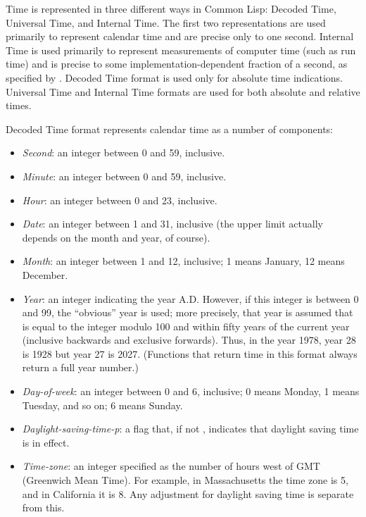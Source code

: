 Time is represented in three different ways in Common Lisp:
Decoded Time, Universal Time, and Internal Time.
The first two representations
are used primarily to represent calendar time and are
precise only to one second.
Internal Time is used primarily to represent measurements of computer
time (such as run time) and is precise to some implementation-dependent
fraction of a second, as specified by .
Decoded Time format is used only for absolute time indications.
Universal Time and Internal Time formats are used for both absolute
and relative times.

Decoded Time format represents calendar time as a number of components:
\begin{itemize}
\item
\emph{Second}: an integer between 0 and 59, inclusive.

\item
\emph{Minute}: an integer between 0 and 59, inclusive.

\item
\emph{Hour}: an integer between 0 and 23, inclusive.

\item
\emph{Date}: an integer between 1 and 31, inclusive (the upper limit actually
depends on the month and year, of course).

\item
\emph{Month}: an integer between 1 and 12, inclusive; 1 means January,
12 means December.

\item
\emph{Year}: an integer indicating the year A.D.  However, if this integer
is between 0 and 99, the ``obvious'' year is used; more precisely,
that year is assumed that is equal to the integer modulo 100 and
within fifty years of the current year (inclusive backwards
and exclusive forwards).  Thus, in the year 1978, year 28 is 1928
but year 27 is 2027.  (Functions that return time in this format always return
a full year number.)
\end{itemize}

\begin{itemize}
\item
\emph{Day-of-week}: an integer between 0 and 6, inclusive;
0 means Monday, 1 means Tuesday, and so on; 6 means Sunday.

\item
\emph{Daylight-saving-time-p}: a flag that, if not {\false}, indicates that
daylight saving time is in effect.

\item
\emph{Time-zone}: an integer specified as the number of hours west of GMT
(Greenwich Mean Time).  For example, in Massachusetts the time zone is 5,
and in California it is 8.  Any adjustment for daylight saving time is
separate from this.
\end{itemize}

